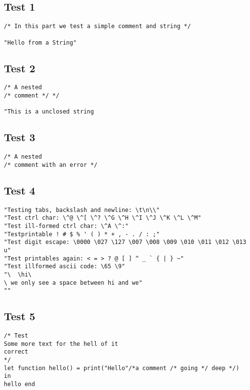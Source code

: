 \documentclass{article}
\begin{document}
\subsection{Test 1}
\begin{lstlisting}[frame=single]
/* In this part we test a simple comment and string */

"Hello from a String"
\end{lstlisting}


\subsection{Test 2}
\begin{lstlisting}[frame=single]
/* A nested
/* comment */ */

"This is a unclosed string
\end{lstlisting}

\subsection{Test 3}
\begin{lstlisting}[frame=single]
/* A nested
/* comment with an error */ 

\end{lstlisting}

\subsection{Test 4}
\begin{lstlisting}[frame=single]
"Testing tabs, backslash and newline: \t\n\\"
"Test ctrl char: \^@ \^[ \^? \^G \^H \^I \^J \^K \^L \^M"
"Test ill-formed ctrl char: \^A \^:"
"Testprintable ! # $ % ' ( ) * + , - . / : ;"
"Test digit escape: \0000 \027 \127 \007 \008 \009 \010 \011 \012 \013 u"
"Test printables again: < = > ? @ [ ] ^ _ ` { | } ~"
"Test illformed ascii code: \65 \9"
"\	\hi\
\ we only see a space between hi and we"
""
\end{lstlisting}

\subsection{Test 5}
\begin{lstlisting}[frame=single]
/* Test 
Some more text for the hell of it
correct
*/
let function hello() = print("Hello"/*a comment /* going */ deep */) in 
hello end
\end{lstlisting}
\end{document}
